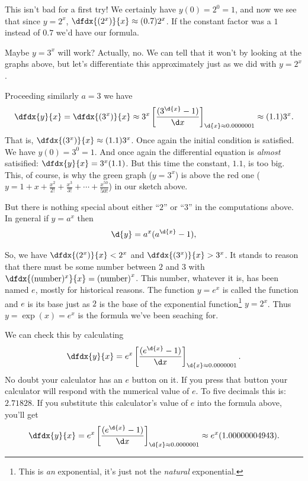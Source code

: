 This isn't bad for a first try! We certainly have
$y(0)=2^0=1$, and now we see that since $y=2^x$,
$\dfdx{(2^x)}{x}\approx (0.7)2^x$. If the constant
factor was a $1$ instead of $0.7$ we'd have our formula.

Maybe $y=3^x$ will work? Actually, no. We can tell that it won't by
looking at the graphs above, but let's differentiate this
approximately just as we did with $y=2^x$.

Proceeding similarly $a=3$ we have
\begin{equation}
  \dfdx{y}{x}=\dfdx{(3^x)}{x}\approx 3^x\left[\frac{(3^{\d{x}}-1)}{\d
      x}\right]_{\d{x}\approx0.0000001} \approx
  (1.1)3^x.
  \label{eq:Exp3}
\end{equation}
That is, $\dfdx{(3^x)}{x}\approx (1.1)3^x$.
Once again the initial condition is satisfied. We have $y(0)=3^0=1$.
And once again the differential equation is {\it almost} satisified:
$\dfdx{y}{x}=3^x(1.1)$. But this time the constant, $1.1$, is too
big. This, of course, is why the green graph ($y=3^x$) is above the
red one ($y=1+x+\frac{x^2}{2!}+\frac{x^3}{3!}+ \cdots +
\frac{x^{50}}{50!}$) in our sketch above.

But there is nothing special about either ``$2$'' or ``$3$'' in the
computations above.
In general if $y=a^x$  then
\begin{equation}
  \d{y} = a^x(a^{\d{x}}-1),\label{eq:a^x}
\end{equation}

So, we have $\dfdx{(2^x)}{x}<2^x$ and $\dfdx{(3^x)}{x}>3^x$.  It
stands to reason that there must be some number between $2$ and $3$
with $\dfdx{(\text{number})^x}{x}=\text{(number)}^x$.  This number,
whatever it is, has been named $e$, mostly for historical reasons. The
function $y=e^x$ is called the 
function and $e$ is its
base just as $2$ is the base of the exponential function\footnote{This
is \emph{an} exponential, it's just not the \emph{natural}
exponential.} $y=2^x$. Thus $y=\exp(x)=e^x$ is the
formula we've been seaching for.



We can check this by calculating
$$
\dfdx{y}{x}= e^x\left[\frac{(e^{\d{x}}-1)}{\d
    x}\right]_{\d{x}\approx0.0000001}.
$$
No doubt your calculator has an $e$ button on it. If you press that
button your calculator will respond with the numerical value of
$e$. To five decimals this is: $2.71828$. If you substitute
this calculator's value of $e$ into the formula above, you'll get
$$
\dfdx{y}{x}= e^x\left[\frac{(e^{\d{x}}-1)}{\d
    x}\right]_{\d{x}\approx0.0000001}\approx e^x(1.00000004943).
$$

